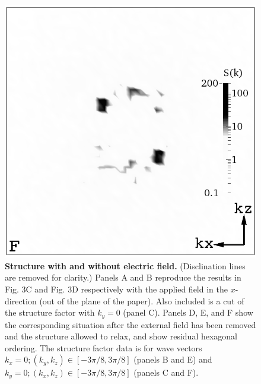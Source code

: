 \documentclass[12pt,twoside]{article}
\begin{document}
\begin{figure}[!h]
\begin{center}
\includegraphics[width=0.32\columnwidth]{sq_y_run1342.png}
\end{center}
\caption{\textbf{Structure with and without electric field.}
(Disclination lines are 
removed for clarity.) Panels A and B reproduce the results in Fig. 3C and
Fig. 3D respectively with the applied field in the $x$-direction 
(out of the plane of the paper). Also included is a cut of the structure 
factor with $k_y = 0$ (panel C). 
Panels D, E, and F show the corresponding situation after the
external field has been removed and the structure allowed to relax,
and show residual hexagonal ordering. The structure factor data is for wave
vectors $k_x = 0; (k_y, k_z) \in [-3\pi/8 , 3\pi/8]$ (panels B and E) and
$k_y = 0; (k_x, k_z) \in [-3\pi/8, 3\pi/8]$ (panels C and F).}
\end{figure}

\newpage
\end{document}
